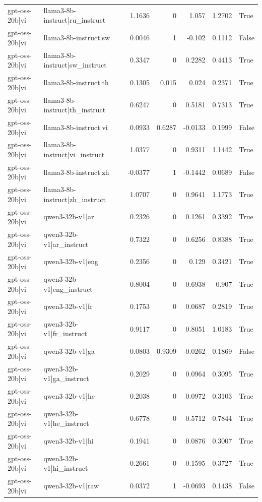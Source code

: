 \begin{table}
\begin{tabular}{l l r r r r l}
gpt-oss-20b|vi & llama3-8b-instruct|ru_instruct & 1.1636 & 0 & 1.057 & 1.2702 & True \\
gpt-oss-20b|vi & llama3-8b-instruct|sw & 0.0046 & 1 & -0.102 & 0.1112 & False \\
gpt-oss-20b|vi & llama3-8b-instruct|sw_instruct & 0.3347 & 0 & 0.2282 & 0.4413 & True \\
gpt-oss-20b|vi & llama3-8b-instruct|th & 0.1305 & 0.015 & 0.024 & 0.2371 & True \\
gpt-oss-20b|vi & llama3-8b-instruct|th_instruct & 0.6247 & 0 & 0.5181 & 0.7313 & True \\
gpt-oss-20b|vi & llama3-8b-instruct|vi & 0.0933 & 0.6287 & -0.0133 & 0.1999 & False \\
gpt-oss-20b|vi & llama3-8b-instruct|vi_instruct & 1.0377 & 0 & 0.9311 & 1.1442 & True \\
gpt-oss-20b|vi & llama3-8b-instruct|zh & -0.0377 & 1 & -0.1442 & 0.0689 & False \\
gpt-oss-20b|vi & llama3-8b-instruct|zh_instruct & 1.0707 & 0 & 0.9641 & 1.1773 & True \\
gpt-oss-20b|vi & qwen3-32b-v1|ar & 0.2326 & 0 & 0.1261 & 0.3392 & True \\
gpt-oss-20b|vi & qwen3-32b-v1|ar_instruct & 0.7322 & 0 & 0.6256 & 0.8388 & True \\
gpt-oss-20b|vi & qwen3-32b-v1|eng & 0.2356 & 0 & 0.129 & 0.3421 & True \\
gpt-oss-20b|vi & qwen3-32b-v1|eng_instruct & 0.8004 & 0 & 0.6938 & 0.907 & True \\
gpt-oss-20b|vi & qwen3-32b-v1|fr & 0.1753 & 0 & 0.0687 & 0.2819 & True \\
gpt-oss-20b|vi & qwen3-32b-v1|fr_instruct & 0.9117 & 0 & 0.8051 & 1.0183 & True \\
gpt-oss-20b|vi & qwen3-32b-v1|ga & 0.0803 & 0.9309 & -0.0262 & 0.1869 & False \\
gpt-oss-20b|vi & qwen3-32b-v1|ga_instruct & 0.2029 & 0 & 0.0964 & 0.3095 & True \\
gpt-oss-20b|vi & qwen3-32b-v1|he & 0.2038 & 0 & 0.0972 & 0.3103 & True \\
gpt-oss-20b|vi & qwen3-32b-v1|he_instruct & 0.6778 & 0 & 0.5712 & 0.7844 & True \\
gpt-oss-20b|vi & qwen3-32b-v1|hi & 0.1941 & 0 & 0.0876 & 0.3007 & True \\
gpt-oss-20b|vi & qwen3-32b-v1|hi_instruct & 0.2661 & 0 & 0.1595 & 0.3727 & True \\
gpt-oss-20b|vi & qwen3-32b-v1|raw & 0.0372 & 1 & -0.0693 & 0.1438 & False \\

\end{tabular}
\end{table}
